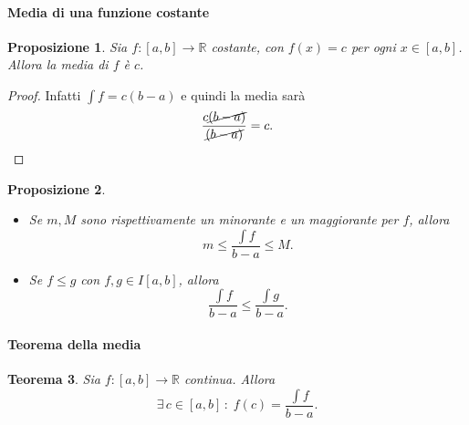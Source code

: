 \documentclass{article}
\theoremstyle{plain}
\newtheorem{thm}{Teorema}[section]
\newtheorem{prop}[thm]{Proposizione}
\theoremstyle{definition}
\theoremstyle{remark}
\begin{document}
\vspace{10pt}

\paragraph{Media di una funzione costante}
\begin{bxthm}
\begin{prop}
    Sia $f:[a,b]\to\mathbb{R}$ costante, con $f(x)=c$ per ogni $x\in[a,b]$. Allora la media di $f$ è $c$.
\end{prop}
\end{bxthm}
\begin{proof}
    Infatti $\int f = c(b-a)$ e quindi la media sarà \[\dfrac{c\cancel{(b-a)}}{\cancel{(b-a)}}=c.\]
\end{proof}

\vspace{10pt}

\begin{bxthm}
\begin{prop}\hfill
    \begin{itemize}
        \item Se $m,M$ sono rispettivamente un minorante e un maggiorante per $f$, allora 
        \[m\leq\dfrac{\int f}{b-a}\leq M.\]
        \item Se $f\leq g$ con $f,g\in I[a,b]$, allora 
        \[\dfrac{\int f}{b-a}\leq\dfrac{\int g}{b-a}.\]
    \end{itemize}
\end{prop}
\end{bxthm}

\vspace{10pt}

\paragraph{Teorema della media}
\begin{bxthm}
\begin{thm}
    Sia $f:[a,b]\to\mathbb{R}$ continua. Allora 
    \[\exists\,c\in[a,b]\,:\;f(c)=\dfrac{\int f}{b-a}.\]
\end{thm}
\end{bxthm}

\vspace{10pt}
\end{document}
